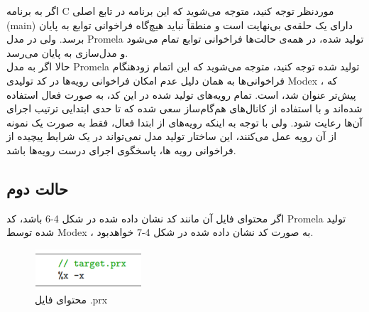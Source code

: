 اگر به برنامه C موردنظر توجه کنید، متوجه می‌شوید که این برنامه در تابع اصلی (main) دارای یک حلقه‌ی بی‌نهایت است و منطقاً نباید هیچ‌گاه فراخوانی توابع به پایان برسد. ولی در مدل Promela تولید شده، در همه‌ی حالت‌ها فراخوانی توابع تمام می‌شود و مدل‌سازی به پایان می‌رسد.
\\
حالا اگر به مدل Promela تولید شده توجه کنید، متوجه می‌شوید که این اتمام زودهنگام فراخوانی‌ها به همان دلیل عدم امکان فراخوانی رویه‌ها در کد تولیدی Modex ، که پیش‌تر عنوان شد، است. تمام رویه‌های تولید شده در این کد، به صورت فعال  استفاده شده‌اند و با استفاده از کانال‌های هم‌گام‌ساز    سعی شده که تا حدی ابتدایی ترتیب اجرای آن‌ها رعایت شود. ولی با توجه به اینکه رویه‌های از ابتدا فعال، فقط به صورت یک نمونه   از آن رویه عمل می‌کنند، این ساختار تولید مدل نمی‌تواند در یک شرایط پیچیده از فراخوانی رویه ها، پاسخگوی اجرای درست رویه‌ها باشد.


\subsection{حالت دوم}
اگر محتوای فایل  آن مانند کد نشان داده شده در شکل 4-6 باشد، کد Promela تولید شده توسط Modex ، به صورت کد نشان داده شده در شکل 4-7 خواهدبود.

 \begin{figure}
	\centering
	\includegraphics[height=1.5cm,width=4cm]{f.png}
	\caption{محتوای فایل .prx}
	\centering
\end{figure}



